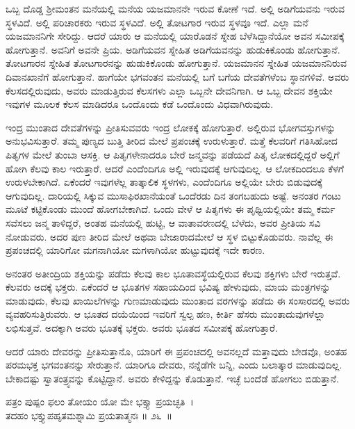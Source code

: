 ಒಬ್ಬ ದೊಡ್ಡ ಶ‍್ರೀಮಂತನ ಮನೆಯಲ್ಲಿ ಮನೆಯ ಯಜಮಾನನೇ ಇರುವ ಕೋಣೆ ಇದೆ. ಅಲ್ಲಿ ಅಡಿಗೆಯವನು ಇರುವ ಸ್ಥಳವಿದೆ. ಅಲ್ಲಿ ಪರಿಚಾರಕರು ಇರುವ ಸ್ಥಳವಿದೆ. ಅಲ್ಲಿ ತೋಟಗಾರ ಇರುವ ಸ್ಥಳವೂ ಇದೆ. ಎಲ್ಲಾ ಮನೆ ಯಜಮಾನನಿಗೇ ಸೇರಿದ್ದು. ಆದರೆ ಯಾರು ಆ ಮನೆಯಲ್ಲಿ ಯಾರೊಡನೆ ಸ್ನೇಹ ಬೆಳೆಸಿದ್ದಾನೆಯೋ ಅವನ ಸಮೀಪಕ್ಕೆ ಹೋಗುತ್ತಾನೆ. ಅವನಿಗೆ ಅವನೇ ಪ್ರಿಯ. ಅಡಿಗೆಯವನ ಸ್ನೇಹಿತ ಅಡಿಗೆಯವನನ್ನು ಹುಡುಕಿಕೊಂಡು ಹೋಗುತ್ತಾನೆ. ತೋಟಗಾರನ ಸ್ನೇಹಿತ ತೋಟಗಾರನನ್ನು ಹುಡುಕಿಕೊಂಡು ಹೋಗುತ್ತಾನೆ. ಯಜಮಾನನ ಸ್ನೇಹಿತ ಯಜಮಾನನಿರುವ ದಿವಾನಖಾನೆಗೆ ಹೋಗುತ್ತಾನೆ. ಹಾಗೆಯೇ ಭಗವಂತನ ಮನೆಯಲ್ಲಿ ಬಗೆ ಬಗೆಯ ದೇವತೆಗಳೆಂಬ ಸ್ಥಾನಗಳಿವೆ. ಅವರು ಕೆಲಸದಲ್ಲಿರುವುದು, ಅವರು ಮಾಡುತ್ತಿರುವ ಕೆಲಸಗಳು ಎಲ್ಲಾ ಒಬ್ಬನೇ ದೇವನಿಗಾಗಿ. ಆ ಒಬ್ಬ ದೇವನ ಶಕ್ತಿಯೇ ಇವುಗಳ ಮೂಲಕ ಕೆಲಸ ಮಾಡಿದರೂ ಒಂದೊಂದು ಕಡೆ ಒಂದೊಂದು ವಿಧವಾಗಿರುವುದು. 

ಇಂದ್ರ ಮುಂತಾದ ದೇವತೆಗಳನ್ನು ಪ್ರೀತಿಸುವವರು ಇಂದ್ರ ಲೋಕಕ್ಕೆ ಹೋಗುತ್ತಾರೆ. ಅಲ್ಲಿ\-ರುವ ಭೋಗವಸ್ತುಗಳನ್ನು ಅನುಭವಿಸುತ್ತಾರೆ. ತಮ್ಮ ಪುಣ್ಯದ ಬುತ್ತಿ ತೀರಿದ ಮೇಲೆ ಪ್ರಪಂಚಕ್ಕೆ ಉರುಳುತ್ತಾರೆ. ಮತ್ತೆ ಕೆಲವರಿಗೆ ಗತಿಸಿಹೋದ ಪಿತೃಗಳ ಮೇಲೆ ತುಂಬಾ ಆಸಕ್ತಿ. ಆ ಪಿತೃಗಳೇ\-ನಾದರೂ ಬೇರೆ ಜನ್ಮವನ್ನು ಪಡೆಯದೆ ಪಿತೃ ಲೋಕದಲ್ಲಿದ್ದರೆ ಅಲ್ಲಿಗೆ ಹೋಗಿ ಕೆಲವು ಕಾಲ ಇರುತ್ತಾರೆ. ಆದರೆ ಎಂದೆಂದಿಗೂ ಅಲ್ಲಿ ಇರುವುದಕ್ಕೆ ಆಗುವುದಿಲ್ಲ. ಆ ಲೋಕದಿಂದಲೂ ಕೆಳಗೆ ಉರುಳಬೇಕಾಗಿದೆ. ಏಕೆಂದರೆ ಇವುಗಳೆಲ್ಲ ತಾತ್ಕಾಲಿಕ ಸ್ಥಳಗಳು, ಎಂದೆಂದಿಗೂ ಅಲ್ಲಿಯೇ ಬೇರು ಬಿಡುವುದಕ್ಕೆ ಆಗುವುದಿಲ್ಲ. ದಾರಿಯಲ್ಲಿ ಸಿಕ್ಕುವ ಮುಸಾಫಿರಖಾನೆಯಂತೆ ಒಂದೆರಡು ದಿನ ತಂಗಬಹುದು ಅಷ್ಟೆ. ಅನಂತರ ಗಂಟು ಮೂಟೆ ಕಟ್ಟಿಕೊಂಡು ಮುಂದೆ ಹೋಗಬೇಕಾಗಿದೆ. ಒಂದು ವೇಳೆ ಆ ಪಿತೃಗಳು ಈ ಪೃಥ್ವಿಯಲ್ಲಿಯೇ ತಮ್ಮ ಕರ್ಮ ಸವೆಸಲು ಜನ್ಮ ತಾಳಿದ್ದರೆ, ಅಂತಹ ಮನೆಯಲ್ಲಿ ಹುಟ್ಟಿ, ಆ ವಾತಾವರಣದಲ್ಲಿ ಬೆಳೆದು, ಅವರ ಪ್ರೀತಿಯ ಸವಿ ನೋಡುವರು. ಅದರ ಪುಣ ತೀರಿದ ಮೇಲೆ ಅಥವಾ ಬೇಜಾರಾದಮೇಲೆ ಆ ಸ್ಥಳ ಬಿಟ್ಟುಕೊಡುವರು. ನಾವೆಲ್ಲ ಈ ಪ್ರಪಂಚದಲ್ಲಿ ಯಾರಿಗೋ ಮಗನಾಗಿಯೋ ಮಗಳಾಗಿಯೋ ಹುಟ್ಟುವುದಕ್ಕೆ ಇದೇ ಕಾರಣ.

ಅನಂತರ ಅತೀಂದ್ರಿಯ ಶಕ್ತಿಯನ್ನು ಪಡೆದು ಕೆಲವು ಕಾಲ ಭೂತಾವಸ್ಥೆಯಲ್ಲಿರುವ ಕೆಲವು ಶಕ್ತಿಗಳು ಬೇರೆ ಇರುತ್ತವೆ. ಕೆಲವರು ಅದಕ್ಕೆ ಭಕ್ತರು. ಏಕೆಂದರೆ ಆ ಭೂತಗಳ ಸಹಾಯದಿಂದ ಭವಿಷ್ಯ ಹೇಳುವುದು, ಮಾಯ ಮಂತ್ರಗಳನ್ನು ಮಾಡುವುದು, ಕೆಲವು ಖಾಯಿಲೆಗಳನ್ನು ಗುಣಮಾಡುವುದು ಮುಂತಾದ ವರಗಳನ್ನು ಪಡೆದು ಈ ಸಂಸಾರದಲ್ಲಿ ಅವರು ವ್ಯವಹರಿಸುತ್ತಿರುವರು. ಆ ಭೂತದ ದಯೆಯಿಂದ ಇವರಿಗೆ ಸ್ವಲ್ಪ ಹಣ, ಕೀರ್ತಿ ಹೆಸರು ಮುಂತಾದುವುಗಳೆಲ್ಲಾ ಲಭಿಸುತ್ತವೆ. ಅದಕ್ಕಾಗಿ ಅವರು ಭೂತಕ್ಕೆ ಭಕ್ತರು. ಅವರು ಭೂತದ ಸಮೀಪಕ್ಕೆ ಹೋಗುತ್ತಾರೆ.

ಆದರೆ ಯಾರು ದೇವರನ್ನು ಪ್ರೀತಿಸುತ್ತಾನೊ, ಯಾರಿಗೆ ಈ ಪ್ರಪಂಚದಲ್ಲಿ ಅವನಲ್ಲದೆ ಮತ್ತಾವುದು ಬೇಡವೊ, ಅಂತಹ ಪರಮಭಕ್ತ ಭಗವಂತನನ್ನು ಸೇರುತ್ತಾನೆ. ಯಾರಿಗೂ ದೇವರು, ನನ್ನೆಡೆಗೇ ಬನ್ನಿ, ಎಂದು ಬಲಾತ್ಕಾರ ಮಾಡುವುದಿಲ್ಲ. ಬೇಕಾದಷ್ಟು ಸ್ವಾತಂತ್ರ್ಯವನ್ನು ಕೊಟ್ಟಿದ್ದಾನೆ. ಅವರು ಕೇಳಿದ್ದನ್ನು ಕೊಡುತ್ತಾನೆ. ಇಚ್ಛೆ ಬಂದೆಡೆ ಹೋಗಲು ಬಿಡುತ್ತಾನೆ.

\begin{shloka}
ಪತ್ರಂ ಪುಷ್ಪಂ ಫಲಂ ತೋಯಂ ಯೋ ಮೇ ಭಕ್ತ್ಯಾ ಪ್ರಯಚ್ಛತಿ~।\\ತದಹಂ ಭಕ್ತ್ಯುಪಹೃತಮಶ್ನಾಮಿ ಪ್ರಯತಾತ್ಮನಃ \hfill॥ ೨೬~॥
\end{shloka}

